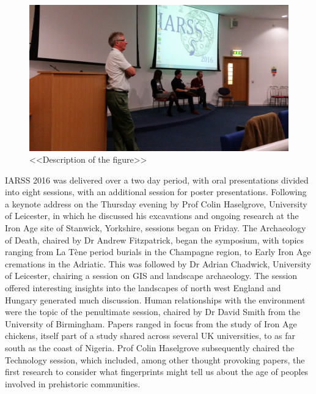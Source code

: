 \documentclass[ngerman,english]{ijsra}
\begin{document}
\begin{figure}
\centering
\includegraphics[width=\linewidth]{figures/IARSS_Session}
\caption{<<Description of the figure>>}
\label{fig:IARSS_Session}
\end{figure} 


IARSS 2016 was delivered over a two day period, with oral presentations divided into eight sessions, with an additional session for poster presentations. Following a keynote address on the Thursday evening by Prof Colin Haselgrove, University of Leicester, in which he discussed his excavations and ongoing research at the Iron Age site of Stanwick, Yorkshire, sessions began on Friday. The Archaeology of Death, chaired by Dr Andrew Fitzpatrick, began the symposium, with topics ranging from La Tène period burials in the Champagne region, to Early Iron Age cremations in the Adriatic. 
This was followed by Dr Adrian Chadwick, University of Leicester, chairing a session on GIS and landscape archaeology. The session offered interesting insights into the landscapes of north west England and Hungary generated much discussion. Human relationships with the environment were the topic of the penultimate session, chaired by Dr David Smith from the University of Birmingham. Papers ranged in focus from the study of Iron Age chickens, itself part of a study shared across several UK universities, to as far south as the coast of Nigeria. Prof Colin Haselgrove subsequently chaired the Technology session, which included, among other thought provoking papers, the first research to consider what fingerprints might tell us about the age of peoples involved in prehistoric communities.
\end{document}
